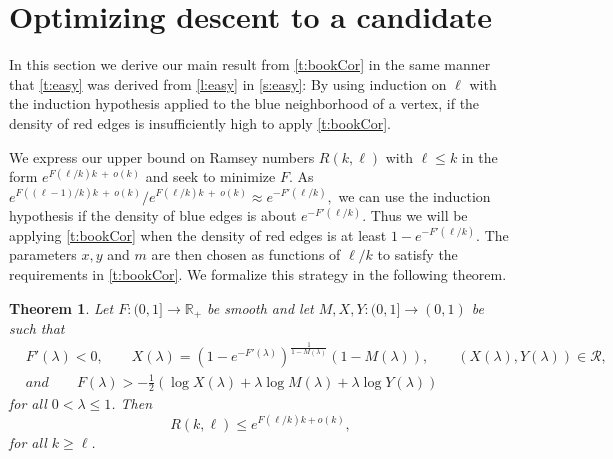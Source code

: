\documentclass[reqno,final,12pt]{amsart}
\newtheorem{thm}{Theorem}
\newcommand{\mc}[1]{\mathcal{#1}}
\newcommand{\bb}[1]{\mathbb{#1}}
\newcommand{\s}[1]{\left(#1\right)}
\begin{document}
\section{Optimizing descent to a candidate}\label{s:opt}


In this section we derive our main result from \cref{t:bookCor} in the same manner that \cref{t:easy} was derived from \cref{l:easy} in \cref{s:easy}: By using induction on $\ell$ with the induction hypothesis applied to the blue neighborhood of a vertex, if the density of red edges is insufficiently high to apply  \cref{t:bookCor}.

We express our upper bound on Ramsey numbers $R(k,\ell)$ with $\ell \leq k$ in the form $e^{F(\ell/k)k~+~o(k)}$ and seek to minimize $F$. As $e^{F((\ell-1)/k)k~+~o(k)}/e^{F(\ell/k)k~+~o(k)} \approx e^{-F'(\ell/k)},$ we can use the induction hypothesis  if the density of blue edges is about $e^{-F'(\ell/k)}$. Thus we will be applying  \cref{t:bookCor} when the density of red edges is at least $1 - e^{-F'(\ell/k)}$. The parameters $x, y$ and $m$ are then chosen as functions of $\ell/k$ to satisfy the requirements in \cref{t:bookCor}. We formalize this strategy in the following theorem.

\begin{thm}\label{t:general}
	Let $F:(0,1] \to \bb{R}_+$ be smooth and let $M,X,Y:(0,1] \to (0,1)$ be such that  
	\begin{align*} &F'(\lambda) <0, \qquad  X(\lambda) = (1 - e^{-F'(\lambda)})^{\frac{1}{1-M(\lambda)}}(1-M(\lambda)), \qquad (X(\lambda),Y(\lambda)) \in \mc{R},
\\ & and  \qquad F(\lambda) > -\frac{1}{2} \s{\log X(\lambda)+ \lambda \log M(\lambda) + \lambda\log Y(\lambda)} \end{align*}
for all $0< \lambda \leq 1$. 
Then $$R(k,\ell) \leq e^{F(\ell/k)k + o(k)},$$	
	for all $k \geq \ell$.
\end{thm}
\end{document}
